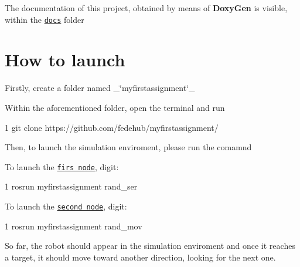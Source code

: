 The documentation of this project, obtained by means of {\bfseries Doxy\+Gen} is visible, within the \href{https://github.com/fedehub/myfirstassignment/blob/main/docs}{\tt docs} folder

\section*{How to launch}


\begin{DoxyEnumerate}
\item Firstly, create a folder named \+\_\+\char`\"{}myfirstassignment\char`\"{}\+\_\+
\item Within the aforementioned folder, open the terminal and run 
\begin{DoxyCode}
1 git clone https://github.com/fedehub/myfirstassignment/
\end{DoxyCode}

\item Then, to launch the simulation enviroment, please run the comamnd 

\item To launch the \href{https://github.com/fedehub/myfirstassignment/blob/main/src/random_movement.cpp}{\tt firs node}, digit\+:
\end{DoxyEnumerate}


\begin{DoxyCode}
1 rosrun myfirstassignment rand\_ser 
\end{DoxyCode}

\begin{DoxyEnumerate}
\item To launch the \href{https://github.com/fedehub/myfirstassignment/blob/main/src/random_service.cpp}{\tt second node}, digit\+:
\end{DoxyEnumerate}


\begin{DoxyCode}
1 rosrun myfirstassignment rand\_mov 
\end{DoxyCode}


So far, the robot should appear in the simulation enviroment and once it reaches a target, it should move toward another direction, looking for the next one. 